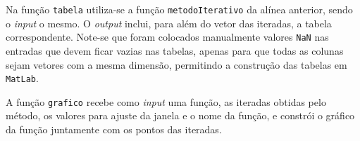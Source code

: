 
Na função \texttt{tabela} utiliza-se a função \texttt{metodoIterativo} da alínea anterior, sendo o \textit{input} o mesmo. O \textit{output} inclui, para além do vetor das iteradas, a tabela correspondente. Note-se que foram colocados manualmente valores \texttt{NaN} nas entradas que devem ficar vazias nas tabelas, apenas para que todas as colunas sejam vetores com a mesma dimensão, permitindo a construção das tabelas em \texttt{MatLab}.


A função \texttt{grafico} recebe como \textit{input} uma função, as iteradas obtidas pelo método, os valores para ajuste da janela e o nome da função, e constrói o gráfico da função juntamente com os pontos das iteradas.